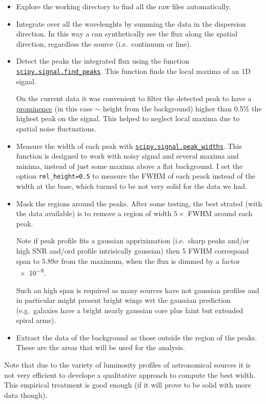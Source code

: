 \documentclass{article}
\begin{document}
\begin{itemize}
	\item Explore the working directory to find all the raw files automatically.
	
	\item Integrate over all the wavelenghts by summing the data in the dispersion direction. In this way a can synthetically see the flux along the spatial direction, regardless the source (i.e.\ continuum or line).
	\item Detect the peaks the integrated flux using the function \href{https://docs.scipy.org/doc/scipy/reference/generated/scipy.signal.find_peaks.html}{\texttt{scipy.signal.find\_peaks}}. This function finds the local maxima of an 1D signal.
	
	On the current data it was convenient to filter the detected peak to have a \href{https://en.wikipedia.org/wiki/Topographic_prominence}{prominence} (in this case $\sim$ height from the background) higher than 0.5\% the highest peak on the signal. This helped to neglect local maxima due to spatial noise fluctuations.
	
	\item Measure the width of each peak with \href{https://docs.scipy.org/doc/scipy/reference/generated/scipy.signal.peak_widths.html#scipy.signal.peak_widths}{\texttt{scipy.signal.peak\_widths}}. This function is designed to work with noisy signal and several maxima and minima, instead of just some maxima above a flat background. I set the option \texttt{rel\_height=0.5} to measure the FWHM of each peack instead of the width at the base, which turned to be not very solid for the data we had.
	
	\item Mask the regions around the peaks. After some testing, the best strated (with the data available) is to remove a region of width $ 5\times$ FWHM around each peak.
	
	Note if peak profile fits a gaussian appriximation (i.e.\ sharp peaks and/or high SNR and/ord profile intrisically gaussian) then 5 FWHM correspond span to $5.89\sigma$ from the maximum, when the flux is dimmed by a factor \num{e-8}.
	
	Such an high span is required as many sources have not gaussian profiles and in particular might present bright wings wrt the gaussian prediction (e.g.\ galaxies have a bright nearly gaussian core plus faint but extended spiral arms).
	
	\item Extract the data of the background as those outside the region of the peaks. These are the areas that will be used for the analysis.
\end{itemize}
Note that due to the variety of luminosity profiles of astronomical sources it is not very efficient to develope a qualitative approach to compute the best width. This empirical treatment is good enough (if it will prove to be solid with more data though).
\end{document}
